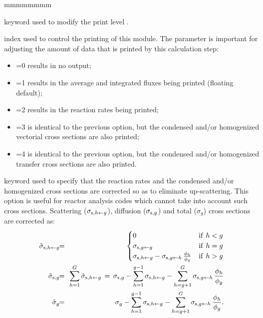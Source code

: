 \begin{ListeDeDescription}{mmmmmmmm}

\item[\moc{EDIT}] keyword used to modify the print level .

\item[\dusa{iprint}] index used to control the printing of this module. The
 parameter is important for adjusting the amount of data that is
printed by this calculation step:

\begin{itemize}

\item {}=0 results in no output;

\item {}=1 results in the average and integrated fluxes being printed
(floating default);

\item {}=2 results in the reaction rates being printed; 

\item {}=3 is identical to the previous option, but the condensed
and/or homogenized vectorial cross sections are also printed;

\item {}=4 is identical to the previous option, but the  condensed
and/or homogenized transfer cross sections are also printed.

\end{itemize}

\item[\moc{UPS}] keyword used to specify that the reaction rates and the condensed
and/or homogenized cross sections are corrected so as to eliminate
up-scattering. This option is useful for reactor analysis codes which cannot
take into account such cross sections. Scattering ($\sigma_{{\rm s},h\gets g}$), diffusion ($\sigma_{{\rm s},g}$)
and total ($\sigma_g$) cross sections are corrected as:
\begin{eqnarray*}
\tilde\sigma_{{\rm s},h\gets g}\negthinspace\negthinspace &=&\negthinspace\negthinspace \begin{cases} 0  & {\rm if} \ h < g\\
\sigma_{{\rm s},g\gets g} &{\rm if}  \ h = g\\
\sigma_{{\rm s},h\gets g}-\sigma_{{\rm s},g\gets h}\, {\phi_h\over \phi_g} & {\rm if}  \ h > g
\end{cases} \\
\tilde\sigma_{{\rm s},g}\negthinspace\negthinspace &=&\negthinspace\negthinspace \sum_{h=1}^G \tilde\sigma_{{\rm s},h\gets g}\, = \, \sigma_{{\rm s},g}-\sum_{h=1}^{g-1} \sigma_{{\rm s},h\gets g}-\sum_{h=g+1}^{G} \sigma_{{\rm s},g\gets h}\, {\phi_h\over \phi_g} \\
\tilde\sigma_{g}\negthinspace\negthinspace &=&\negthinspace\negthinspace \sigma_{g}-\sum_{h=1}^{g-1} \sigma_{{\rm s},h\gets g}-\sum_{h=g+1}^{G} \sigma_{{\rm s},g\gets h}\, {\phi_h\over \phi_g} .
\end{eqnarray*}


\end{ListeDeDescription}
